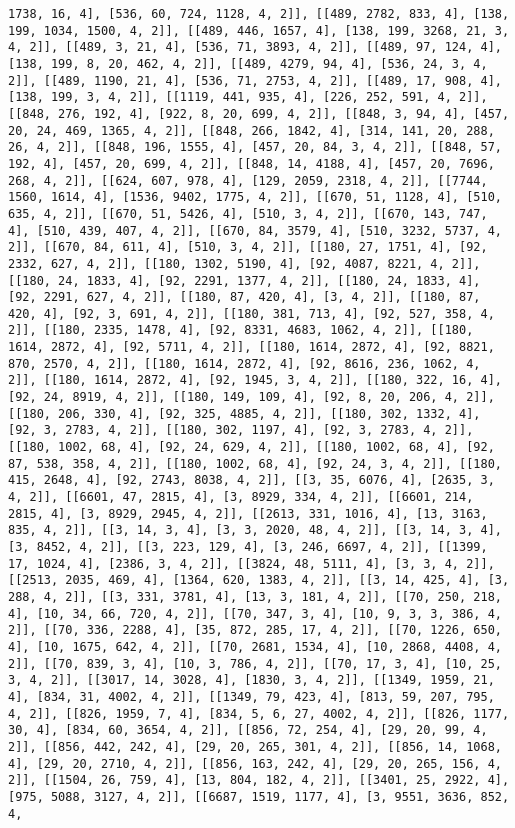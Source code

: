 \documentclass[12pt,fleqn]{article}\usepackage{../../common}
\begin{document}
\begin{verbatim}
1738, 16, 4], [536, 60, 724, 1128, 4, 2]], [[489, 2782, 833, 4], [138, 199, 1034, 1500, 4, 2]], [[489, 446, 1657, 4], [138, 199, 3268, 21, 3, 4, 2]], [[489, 3, 21, 4], [536, 71, 3893, 4, 2]], [[489, 97, 124, 4], [138, 199, 8, 20, 462, 4, 2]], [[489, 4279, 94, 4], [536, 24, 3, 4, 2]], [[489, 1190, 21, 4], [536, 71, 2753, 4, 2]], [[489, 17, 908, 4], [138, 199, 3, 4, 2]], [[1119, 441, 935, 4], [226, 252, 591, 4, 2]], [[848, 276, 192, 4], [922, 8, 20, 699, 4, 2]], [[848, 3, 94, 4], [457, 20, 24, 469, 1365, 4, 2]], [[848, 266, 1842, 4], [314, 141, 20, 288, 26, 4, 2]], [[848, 196, 1555, 4], [457, 20, 84, 3, 4, 2]], [[848, 57, 192, 4], [457, 20, 699, 4, 2]], [[848, 14, 4188, 4], [457, 20, 7696, 268, 4, 2]], [[624, 607, 978, 4], [129, 2059, 2318, 4, 2]], [[7744, 1560, 1614, 4], [1536, 9402, 1775, 4, 2]], [[670, 51, 1128, 4], [510, 635, 4, 2]], [[670, 51, 5426, 4], [510, 3, 4, 2]], [[670, 143, 747, 4], [510, 439, 407, 4, 2]], [[670, 84, 3579, 4], [510, 3232, 5737, 4, 2]], [[670, 84, 611, 4], [510, 3, 4, 2]], [[180, 27, 1751, 4], [92, 2332, 627, 4, 2]], [[180, 1302, 5190, 4], [92, 4087, 8221, 4, 2]], [[180, 24, 1833, 4], [92, 2291, 1377, 4, 2]], [[180, 24, 1833, 4], [92, 2291, 627, 4, 2]], [[180, 87, 420, 4], [3, 4, 2]], [[180, 87, 420, 4], [92, 3, 691, 4, 2]], [[180, 381, 713, 4], [92, 527, 358, 4, 2]], [[180, 2335, 1478, 4], [92, 8331, 4683, 1062, 4, 2]], [[180, 1614, 2872, 4], [92, 5711, 4, 2]], [[180, 1614, 2872, 4], [92, 8821, 870, 2570, 4, 2]], [[180, 1614, 2872, 4], [92, 8616, 236, 1062, 4, 2]], [[180, 1614, 2872, 4], [92, 1945, 3, 4, 2]], [[180, 322, 16, 4], [92, 24, 8919, 4, 2]], [[180, 149, 109, 4], [92, 8, 20, 206, 4, 2]], [[180, 206, 330, 4], [92, 325, 4885, 4, 2]], [[180, 302, 1332, 4], [92, 3, 2783, 4, 2]], [[180, 302, 1197, 4], [92, 3, 2783, 4, 2]], [[180, 1002, 68, 4], [92, 24, 629, 4, 2]], [[180, 1002, 68, 4], [92, 87, 538, 358, 4, 2]], [[180, 1002, 68, 4], [92, 24, 3, 4, 2]], [[180, 415, 2648, 4], [92, 2743, 8038, 4, 2]], [[3, 35, 6076, 4], [2635, 3, 4, 2]], [[6601, 47, 2815, 4], [3, 8929, 334, 4, 2]], [[6601, 214, 2815, 4], [3, 8929, 2945, 4, 2]], [[2613, 331, 1016, 4], [13, 3163, 835, 4, 2]], [[3, 14, 3, 4], [3, 3, 2020, 48, 4, 2]], [[3, 14, 3, 4], [3, 8452, 4, 2]], [[3, 223, 129, 4], [3, 246, 6697, 4, 2]], [[1399, 17, 1024, 4], [2386, 3, 4, 2]], [[3824, 48, 5111, 4], [3, 3, 4, 2]], [[2513, 2035, 469, 4], [1364, 620, 1383, 4, 2]], [[3, 14, 425, 4], [3, 288, 4, 2]], [[3, 331, 3781, 4], [13, 3, 181, 4, 2]], [[70, 250, 218, 4], [10, 34, 66, 720, 4, 2]], [[70, 347, 3, 4], [10, 9, 3, 3, 386, 4, 2]], [[70, 336, 2288, 4], [35, 872, 285, 17, 4, 2]], [[70, 1226, 650, 4], [10, 1675, 642, 4, 2]], [[70, 2681, 1534, 4], [10, 2868, 4408, 4, 2]], [[70, 839, 3, 4], [10, 3, 786, 4, 2]], [[70, 17, 3, 4], [10, 25, 3, 4, 2]], [[3017, 14, 3028, 4], [1830, 3, 4, 2]], [[1349, 1959, 21, 4], [834, 31, 4002, 4, 2]], [[1349, 79, 423, 4], [813, 59, 207, 795, 4, 2]], [[826, 1959, 7, 4], [834, 5, 6, 27, 4002, 4, 2]], [[826, 1177, 30, 4], [834, 60, 3654, 4, 2]], [[856, 72, 254, 4], [29, 20, 99, 4, 2]], [[856, 442, 242, 4], [29, 20, 265, 301, 4, 2]], [[856, 14, 1068, 4], [29, 20, 2710, 4, 2]], [[856, 163, 242, 4], [29, 20, 265, 156, 4, 2]], [[1504, 26, 759, 4], [13, 804, 182, 4, 2]], [[3401, 25, 2922, 4], [975, 5088, 3127, 4, 2]], [[6687, 1519, 1177, 4], [3, 9551, 3636, 852, 4, 
\end{verbatim}
\end{document}
